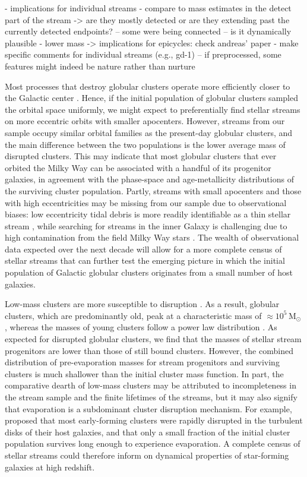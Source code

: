 \documentclass[twocolumn]{aastex63}
\newcommand{\msun}{\ensuremath{\textrm{M}_\odot}}
\begin{document}
- implications for individual streams
- compare to mass estimates in the detect part of the stream -> are they mostly detected or are they extending past the currently detected endpoints? -- some were being connected -- is it dynamically plausible
- lower mass -> implications for epicycles: check andreas' paper
- make specific comments for individual streams (e.g., gd-1)
-- if preprocessed, some features might indeed be nature rather than nurture

Most processes that destroy globular clusters operate more efficiently closer to the Galactic center \citep[e.g.,][]{gnedin:1997}.
Hence, if the initial population of globular clusters sampled the orbital space uniformly, we might expect to preferentially find stellar streams on more eccentric orbits with smaller apocenters.
However, streams from our sample occupy similar orbital families as the present-day globular clusters, and the main difference between the two populations is the lower average mass of disrupted clusters.
This may indicate that most globular clusters that ever orbited the Milky Way can be associated with a handful of its progenitor galaxies, in agreement with the phase-space \citep{massari:2019} and age-metallicity \citep{kruijssen19e,kruijssen20} distributions of the surviving cluster population.
Partly, streams with small apocenters and those with high eccentricities may be missing from our sample due to observational biases: low eccentricity tidal debris is more readily identifiable as a thin stellar stream \citep{hendel:2015}, while searching for streams in the inner Galaxy is challenging due to high contamination from the field Milky Way stars \citep[e.g.,][]{ibata:2019}.
The wealth of observational data expected over the next decade will allow for a more complete census of stellar streams that can further test the emerging picture in which the initial population of Galactic globular clusters originates from a small number of host galaxies.

Low-mass clusters are more susceptible to disruption \citep[e.g.,][]{fall:2001}.
As a result, globular clusters, which are predominantly old, peak at a characteristic mass of $\approx10^5\,\msun$ \citep[e.g.,][]{harris:1991}, whereas the masses of young clusters follow a power law distribution \citep[e.g.,][]{zhang:1999}.
As expected for disrupted globular clusters, we find that the masses of stellar stream progenitors are lower than those of still bound clusters.
However, the combined distribution of pre-evaporation masses for stream progenitors and surviving clusters is much shallower than the initial cluster mass function.
In part, the comparative dearth of low-mass clusters may be attributed to incompleteness in the stream sample and the finite lifetimes of the streams, but it may also signify that evaporation is a subdominant cluster disruption mechanism.
For example, \citet{kruijssen15b} proposed that most early-forming clusters were rapidly disrupted in the turbulent disks of their host galaxies, and that only a small fraction of the initial cluster population survives long enough to experience evaporation.
A complete census of stellar streams could therefore inform on dynamical properties of star-forming galaxies at high redshift.
\end{document}
